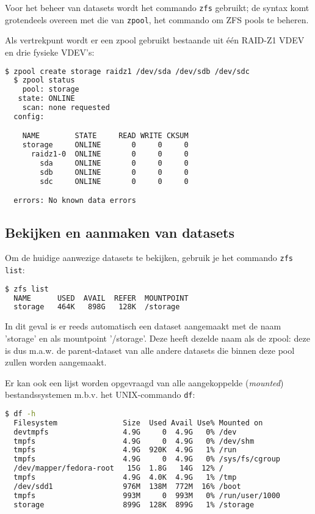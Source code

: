 Voor het beheer van datasets wordt het commando \texttt{zfs} gebruikt; de syntax komt grotendeels overeen met die van \texttt{zpool}, het commando om ZFS pools te beheren. 

Als vertrekpunt wordt er een zpool gebruikt bestaande uit één RAID-Z1 VDEV en drie fysieke VDEV's:

\begin{lstlisting}[language=bash,style=command_style]
  $ zpool create storage raidz1 /dev/sda /dev/sdb /dev/sdc
  $ zpool status
    pool: storage
   state: ONLINE
    scan: none requested
  config:

	NAME        STATE     READ WRITE CKSUM
	storage     ONLINE       0     0     0
	  raidz1-0  ONLINE       0     0     0
	    sda     ONLINE       0     0     0
	    sdb     ONLINE       0     0     0
	    sdc     ONLINE       0     0     0

  errors: No known data errors
\end{lstlisting}

\subsection{Bekijken en aanmaken van datasets}

Om de huidige aanwezige datasets te bekijken, gebruik je het commando \texttt{zfs list}:

\begin{lstlisting}[language=bash,style=command_style] 
  $ zfs list
  NAME      USED  AVAIL  REFER  MOUNTPOINT
  storage   464K   898G   128K  /storage
\end{lstlisting}

In dit geval is er reeds automatisch een dataset aangemaakt met de naam 'storage' en als mountpoint '/storage'. Deze heeft dezelde naam als de zpool: deze is dus m.a.w. de parent-dataset van alle andere datasets die binnen deze pool zullen worden aangemaakt.

Er kan ook een lijst worden opgevraagd van alle aangekoppelde (\textit{mounted}) bestandssystemen m.b.v. het UNIX-commando \texttt{df}:

\begin{lstlisting}[language=bash,style=command_style] 
  $ df -h
  Filesystem               Size  Used Avail Use% Mounted on
  devtmpfs                 4.9G     0  4.9G   0% /dev
  tmpfs                    4.9G     0  4.9G   0% /dev/shm
  tmpfs                    4.9G  920K  4.9G   1% /run
  tmpfs                    4.9G     0  4.9G   0% /sys/fs/cgroup
  /dev/mapper/fedora-root   15G  1.8G   14G  12% /
  tmpfs                    4.9G  4.0K  4.9G   1% /tmp
  /dev/sdd1                976M  138M  772M  16% /boot
  tmpfs                    993M     0  993M   0% /run/user/1000
  storage                  899G  128K  899G   1% /storage 
\end{lstlisting}

